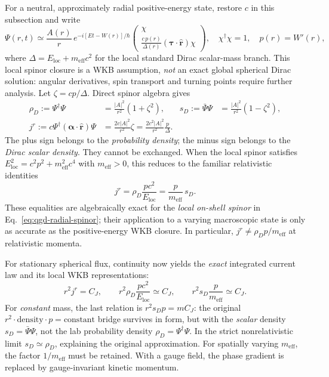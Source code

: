\documentclass[11pt,a4paper]{article}
\begin{document}
For a neutral, approximately radial positive-energy state, restore $c$ in this subsection and write
\begin{equation}\label{eq:qgd-radial-spinor}
\Psi(r,t)\simeq\frac{A(r)}{r}\,e^{-i[Et-W(r)]/\hbar}
\begin{pmatrix}\chi\\[2pt]
\displaystyle\frac{c\,p(r)}{\Delta(r)}
(\bm\tau\cdot\hat{\bm r})\chi\end{pmatrix},\quad
\chi^\dagger\chi=1,\quad p(r)=W'(r),
\end{equation}
where $\Delta=E_{\mathrm{loc}}+m_{\mathrm{eff}}c^2$ for the local standard Dirac scalar-mass branch.  This local spinor closure is a WKB assumption, \emph{not} an exact global spherical Dirac solution: angular derivatives, spin transport and turning points require further analysis.  Let $\zeta=cp/\Delta$.  Direct spinor algebra gives
\begin{align}
\rho_D:=\Psi^\dagger\Psi
&=\frac{|A|^2}{r^2}(1+\zeta^2),
& s_D:=\bar\Psi\Psi
&=\frac{|A|^2}{r^2}(1-\zeta^2),\label{eq:qgd-two-densities}\\
 j^r:=c\Psi^\dagger(\bm\alpha\cdot\hat{\bm r})\Psi
&=\frac{2c|A|^2}{r^2}\zeta
=\frac{2c^2|A|^2}{r^2}\frac{p}{\Delta}.
&&\label{eq:qgd-exact-radial-current}
\end{align}
The plus sign belongs to the \emph{probability density}; the minus sign belongs to the \emph{Dirac scalar density}.  They cannot be exchanged.  When the local spinor satisfies $E_{\mathrm{loc}}^2=c^2p^2+m_{\mathrm{eff}}^2c^4$ with $m_{\mathrm{eff}}>0$, this reduces to the familiar relativistic identities
\begin{equation}\label{eq:qgd-relativistic-flux-closure}
\boxed{\quad j^r=\rho_D\frac{pc^2}{E_{\mathrm{loc}}}
=\frac{p}{m_{\mathrm{eff}}}\,s_D.\quad}
\end{equation}
These equalities are algebraically exact for the \emph{local on-shell spinor} in Eq.~\eqref{eq:qgd-radial-spinor}; their application to a varying macroscopic state is only as accurate as the positive-energy WKB closure.  In particular, $j^r\neq \rho_Dp/m_{\mathrm{eff}}$ at relativistic momenta.

For stationary spherical flux, continuity now yields the \emph{exact} integrated current law and its local WKB representations:
\begin{equation}\label{eq:flux}
\boxed{r^2j^r=C_J,}\qquad
\boxed{r^2\rho_D\frac{pc^2}{E_{\mathrm{loc}}}\simeq C_J,}\qquad
\boxed{r^2s_D\frac{p}{m_{\mathrm{eff}}}\simeq C_J.}
\end{equation}
For \emph{constant} mass, the last relation is $r^2s_Dp=mC_J$: the original $r^2\cdot\text{density}\cdot p=\text{constant}$ bridge survives in form, but with the \emph{scalar} density $s_D=\bar\Psi\Psi$, not the lab probability density $\rho_D=\Psi^\dagger\Psi$.  In the strict nonrelativistic limit $s_D\simeq\rho_D$, explaining the original approximation.  For spatially varying $m_{\mathrm{eff}}$, the factor $1/m_{\mathrm{eff}}$ must be retained.  With a gauge field, the phase gradient is replaced by gauge-invariant kinetic momentum.
\end{document}
